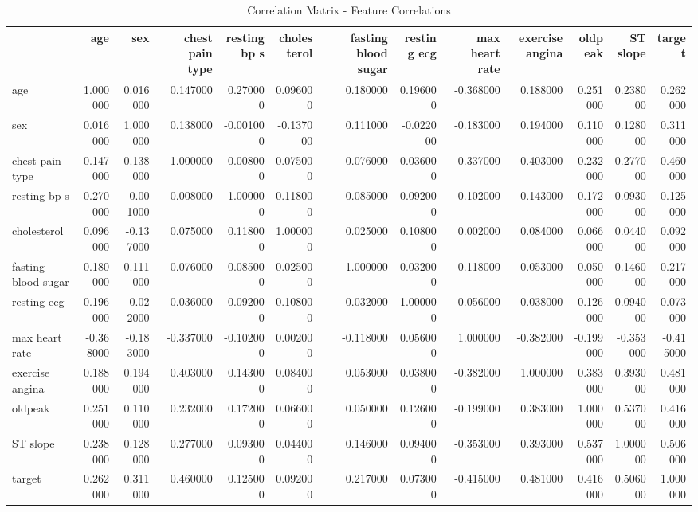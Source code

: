\begin{table}
\caption{Correlation Matrix - Feature Correlations}
\label{tab:corr_matrix}
\begin{tabular}{lrrrrrrrrrrrr}
\toprule
 & age & sex & chest pain type & resting bp s & cholesterol & fasting blood sugar & resting ecg & max heart rate & exercise angina & oldpeak & ST slope & target \\
\midrule
age & 1.000000 & 0.016000 & 0.147000 & 0.270000 & 0.096000 & 0.180000 & 0.196000 & -0.368000 & 0.188000 & 0.251000 & 0.238000 & 0.262000 \\
sex & 0.016000 & 1.000000 & 0.138000 & -0.001000 & -0.137000 & 0.111000 & -0.022000 & -0.183000 & 0.194000 & 0.110000 & 0.128000 & 0.311000 \\
chest pain type & 0.147000 & 0.138000 & 1.000000 & 0.008000 & 0.075000 & 0.076000 & 0.036000 & -0.337000 & 0.403000 & 0.232000 & 0.277000 & 0.460000 \\
resting bp s & 0.270000 & -0.001000 & 0.008000 & 1.000000 & 0.118000 & 0.085000 & 0.092000 & -0.102000 & 0.143000 & 0.172000 & 0.093000 & 0.125000 \\
cholesterol & 0.096000 & -0.137000 & 0.075000 & 0.118000 & 1.000000 & 0.025000 & 0.108000 & 0.002000 & 0.084000 & 0.066000 & 0.044000 & 0.092000 \\
fasting blood sugar & 0.180000 & 0.111000 & 0.076000 & 0.085000 & 0.025000 & 1.000000 & 0.032000 & -0.118000 & 0.053000 & 0.050000 & 0.146000 & 0.217000 \\
resting ecg & 0.196000 & -0.022000 & 0.036000 & 0.092000 & 0.108000 & 0.032000 & 1.000000 & 0.056000 & 0.038000 & 0.126000 & 0.094000 & 0.073000 \\
max heart rate & -0.368000 & -0.183000 & -0.337000 & -0.102000 & 0.002000 & -0.118000 & 0.056000 & 1.000000 & -0.382000 & -0.199000 & -0.353000 & -0.415000 \\
exercise angina & 0.188000 & 0.194000 & 0.403000 & 0.143000 & 0.084000 & 0.053000 & 0.038000 & -0.382000 & 1.000000 & 0.383000 & 0.393000 & 0.481000 \\
oldpeak & 0.251000 & 0.110000 & 0.232000 & 0.172000 & 0.066000 & 0.050000 & 0.126000 & -0.199000 & 0.383000 & 1.000000 & 0.537000 & 0.416000 \\
ST slope & 0.238000 & 0.128000 & 0.277000 & 0.093000 & 0.044000 & 0.146000 & 0.094000 & -0.353000 & 0.393000 & 0.537000 & 1.000000 & 0.506000 \\
target & 0.262000 & 0.311000 & 0.460000 & 0.125000 & 0.092000 & 0.217000 & 0.073000 & -0.415000 & 0.481000 & 0.416000 & 0.506000 & 1.000000 \\
\bottomrule
\end{tabular}
\end{table}
